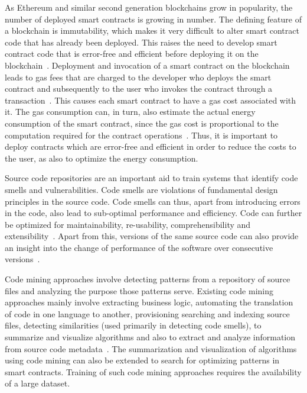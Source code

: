 \documentclass[10pt,conference]{IEEEtran}
\begin{document}
	As Ethereum and similar second generation blockchains grow in popularity, the number of deployed smart contracts is growing in number. The defining feature of a blockchain is immutability, which makes it very difficult to alter smart contract code that has already been deployed. This raises the need to develop smart contract code that is error-free and efficient before deploying it on the blockchain~\cite{brandstatter}. Deployment and invocation of a smart contract on the blockchain leads to gas fees that are charged to the developer who deploys the smart contract and subsequently to the user who invokes the contract through a transaction~\cite{ethpaper}. This causes each smart contract to have a gas cost associated with it. The gas consumption can, in turn, also estimate the actual energy consumption of the smart contract, since the gas cost is proportional to the computation required for the contract operations~\cite{contractenergyconsumptionthesis}. Thus, it is important to deploy contracts which are error-free and efficient in order to reduce the costs to the user, as also to optimize the energy consumption. 
	
	Source code repositories are an important aid to train systems that identify code smells and vulnerabilities. Code smells are violations of fundamental design principles in the source code. Code smells can thus, apart from introducing errors in the code, also lead to sub-optimal performance and efficiency. Code can further be optimized for maintainability, re-usability, comprehensibility and extensibility~\cite{codesmellmining}. Apart from this, versions of the same source code can also provide an insight into the change of performance of the software over consecutive versions~\cite{softwareversion}.
	
	Code mining approaches involve detecting patterns from a repository of source files and analyzing the purpose those patterns serve. Existing code mining approaches mainly involve extracting business logic, automating the translation of code in one language to another, provisioning searching and indexing source files, detecting similarities (used primarily in detecting code smells), to summarize and visualize algorithms and also to extract and analyze information from source code metadata~\cite{codeminingsurvey}. The summarization and visualization of algorithms using code mining can also be extended to search for optimizing patterns in smart contracts. Training of such code mining approaches requires the availability of a large dataset.
	
\end{document}
